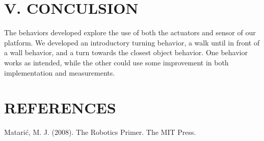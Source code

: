 \documentclass[11pt]{article}
\begin{document}
\section*{V. CONCULSION}
The behaviors developed explore the use of both the actuators and sensor of our platform. We developed an introductory turning behavior, a walk until in front of a wall behavior, and a turn towards the closest object behavior. One behavior works as intended, while the other could use some improvement in both implementation and measurements.

\section*{REFERENCES}

Matarić, M. J. (2008). The Robotics Primer. The MIT Press. 
\end{document}
